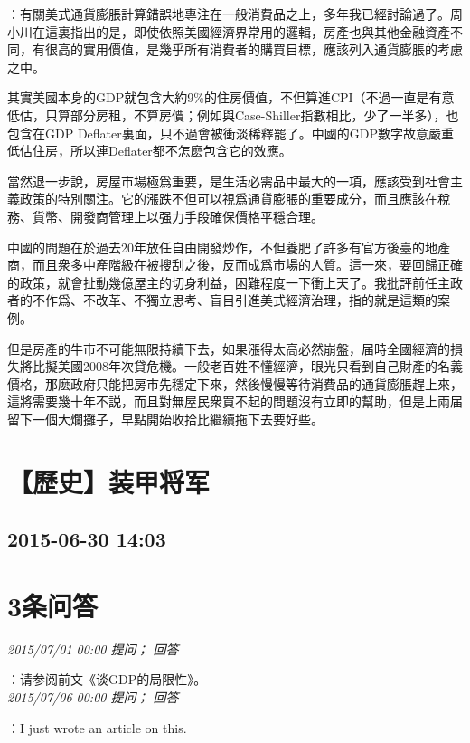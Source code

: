 \documentclass[twocolumn]{ctexart}
\begin{document}
：有關美式通貨膨脹計算錯誤地專注在一般消費品之上，多年我已經討論過了。周小川在這裏指出的是，即使依照美國經濟界常用的邏輯，房產也與其他金融資產不同，有很高的實用價值，是幾乎所有消費者的購買目標，應該列入通貨膨脹的考慮之中。

其實美國本身的GDP就包含大約9\%的住房價值，不但算進CPI（不過一直是有意低估，只算部分房租，不算房價；例如與Case-Shiller指數相比，少了一半多），也包含在GDP Deflater裏面，只不過會被衝淡稀釋罷了。中國的GDP數字故意嚴重低估住房，所以連Deflater都不怎麽包含它的效應。

當然退一步說，房屋市場極爲重要，是生活必需品中最大的一項，應該受到社會主義政策的特別關注。它的漲跌不但可以視爲通貨膨脹的重要成分，而且應該在稅務、貨幣、開發商管理上以强力手段確保價格平穩合理。

中國的問題在於過去20年放任自由開發炒作，不但養肥了許多有官方後臺的地產商，而且衆多中產階級在被搜刮之後，反而成爲市場的人質。這一來，要回歸正確的政策，就會扯動幾億屋主的切身利益，困難程度一下衝上天了。我批評前任主政者的不作爲、不改革、不獨立思考、盲目引進美式經濟治理，指的就是這類的案例。

但是房產的牛市不可能無限持續下去，如果漲得太高必然崩盤，届時全國經濟的損失將比擬美國2008年次貸危機。一般老百姓不懂經濟，眼光只看到自己財產的名義價格，那麽政府只能把房市先穩定下來，然後慢慢等待消費品的通貨膨脹趕上來，這將需要幾十年不説，而且對無屋民衆買不起的問題沒有立即的幫助，但是上兩届留下一個大爛攤子，早點開始收拾比繼續拖下去要好些。
\\


\section{【歷史】装甲将军}
\subsection{2015-06-30 14:03}


\section{3条问答}

\textit{\hfill\noindent\small 2015/07/01 00:00 提问； 回答}

：请参阅前文《谈GDP的局限性》。\\

\textit{\hfill\noindent\small 2015/07/06 00:00 提问； 回答}

：I just wrote an article on this.\\
\end{document}
